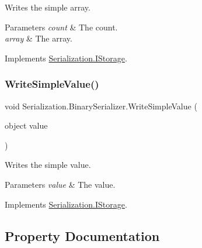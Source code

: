 Writes the simple array. 


\begin{DoxyParams}{Parameters}
{\em count} & The count.\\
\hline
{\em array} & The array.\\
\hline
\end{DoxyParams}


Implements \hyperlink{interface_serialization_1_1_i_storage_a94937afa442d505b3802f9dd19675ee2}{Serialization.\+I\+Storage}.

\mbox{\label{class_serialization_1_1_binary_serializer_a91a35ade763c6b2def327e82a5ea7dad}} 
\subsubsection{\texorpdfstring{Write\+Simple\+Value()}{WriteSimpleValue()}}
{\footnotesize\ttfamily void Serialization.\+Binary\+Serializer.\+Write\+Simple\+Value (\begin{DoxyParamCaption}\item[{object}]{value }\end{DoxyParamCaption})\hspace{0.3cm}{\ttfamily [inline]}}



Writes the simple value. 


\begin{DoxyParams}{Parameters}
{\em value} & The value.\\
\hline
\end{DoxyParams}


Implements \hyperlink{interface_serialization_1_1_i_storage_ad71e5330badb887d80a59b576dbd9e1e}{Serialization.\+I\+Storage}.



\subsection{Property Documentation}
\mbox{\label{class_serialization_1_1_binary_serializer_a52da00a6deec8ded666bc8de60009519}} 
